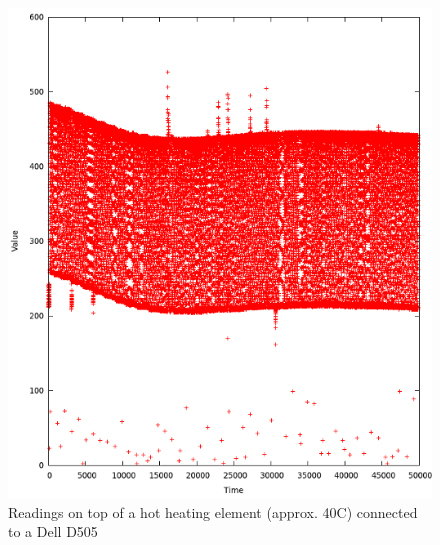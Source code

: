 \documentclass[a4paper]{article}           %
\begin{document}
\begin{figure}[ht!]
  \centering  
  \includegraphics[width=0.5\columnwidth]{img/heating.png}
  \caption{Readings on top of a hot heating element (approx. 40C) connected to a Dell D505}
  \label{fig:ard1heat}
\end{figure}

  
\end{document}
